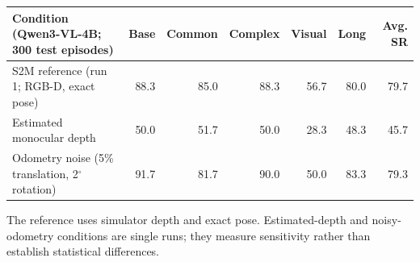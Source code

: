 \begin{tabular}{lrrrrrr}
\toprule
Condition (Qwen3-VL-4B; 300 test episodes) & Base & Common & Complex & Visual & Long & Avg. SR \\
\midrule
S2M reference (run 1; RGB-D, exact pose) & 88.3 & 85.0 & 88.3 & 56.7 & 80.0 & 79.7 \\
Estimated monocular depth & 50.0 & 51.7 & 50.0 & 28.3 & 48.3 & 45.7 \\
Odometry noise (5\% translation, 2$^\circ$ rotation) & 91.7 & 81.7 & 90.0 & 50.0 & 83.3 & 79.3 \\
\bottomrule
\end{tabular}

\vspace{0.25em}\footnotesize The reference uses simulator depth and exact pose. Estimated-depth and noisy-odometry
conditions are single runs; they measure sensitivity rather than establish statistical differences.
